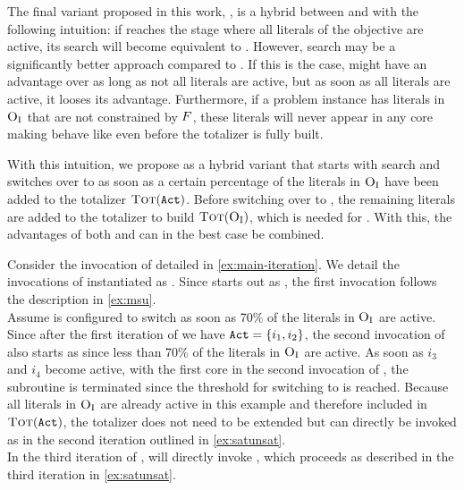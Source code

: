 The final variant proposed in this work, \msh{}, is a hybrid between \msu{} and \satunsat{} with the following intuition:
if \msu{}  reaches the stage where all literals of the objective are active, its search will become equivalent to \unsatsat{}.
However, \satunsat{} search may be a significantly better approach compared to \unsatsat{}.
If this is the case, \msu{} might have an advantage over \satunsat{} as long as not all literals are active, but as soon as all literals are active, it looses its advantage.
Furthermore, if a problem instance has literals in $\textsc{O}_{\text{I}}$ that are not constrained by $F$, these literals will never appear in any core making \msu{} behave like \unsatsat{} even before the totalizer is fully built.

With this intuition, we propose \msh{} as a hybrid variant that starts with \msu{} search and switches over to \satunsat{} as soon as a certain percentage of the literals in $\textsc{O}_{\text{I}}$ have been added to the totalizer $\textsc{Tot}(\texttt{Act})$.
Before switching over to \satunsat{}, the remaining literals are added to the totalizer to build $\textsc{Tot}(\textsc{O}_{\text{I}})$, which is needed for \satunsat{}.
With this, the advantages of both \msu{} and \satunsat{} can in the best case be combined.

\begin{example}
  Consider the invocation of \algname{} detailed in \cref{ex:main-iteration}.
  We detail the invocations of \Min{} instantiated as \msh{}.
  Since \msh{} starts out as \msu{}, the first invocation follows the description in \cref{ex:msu}. \\
  Assume \msh{} is configured to switch as soon as 70\% of the literals in $\textsc{O}_{\text{I}}$ are active.
  Since after the first iteration of \algname{} we have $\texttt{Act} = \{i_1, i_2\}$, the second invocation of \msh{} also starts as \msu{} since less than 70\% of the literals in $\textsc{O}_{\text{I}}$ are active.
  As soon as $i_3$ and $i_4$ become active, with the first core in the second invocation of \msu{}, the \msu{} subroutine is terminated since the threshold for switching to \satunsat{} is reached.
  Because all literals in $\textsc{O}_{\text{I}}$ are already active in this example and therefore included in $\textsc{Tot}(\texttt{Act})$, the totalizer does not need to be extended but \satunsat{} can directly be invoked as in the second iteration outlined in \cref{ex:satunsat}. \\
  In the third iteration of \algname{}, \msh{} will directly invoke \satunsat{}, which proceeds as described in the third iteration in \cref{ex:satunsat}.
\end{example}

